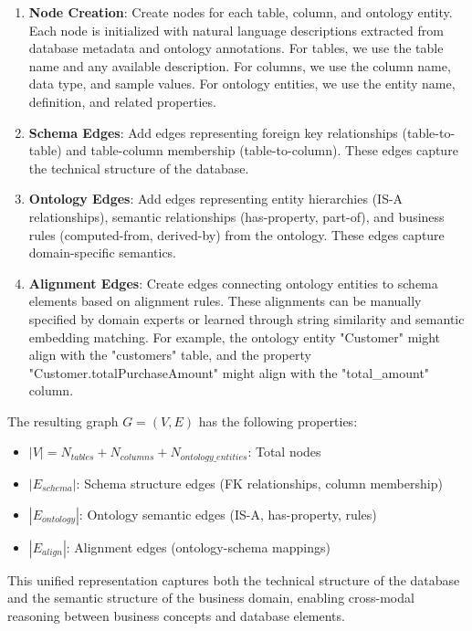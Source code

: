 \documentclass[sigconf, nonatbib]{acmart}
\begin{document}
\begin{enumerate}
    \item \textbf{Node Creation}: Create nodes for each table, column, and ontology entity. Each node is initialized with natural language descriptions extracted from database metadata and ontology annotations. For tables, we use the table name and any available description. For columns, we use the column name, data type, and sample values. For ontology entities, we use the entity name, definition, and related properties.
    
    \item \textbf{Schema Edges}: Add edges representing foreign key relationships (table-to-table) and table-column membership (table-to-column). These edges capture the technical structure of the database.
    
    \item \textbf{Ontology Edges}: Add edges representing entity hierarchies (IS-A relationships), semantic relationships (has-property, part-of), and business rules (computed-from, derived-by) from the ontology. These edges capture domain-specific semantics.
    
    \item \textbf{Alignment Edges}: Create edges connecting ontology entities to schema elements based on alignment rules. These alignments can be manually specified by domain experts or learned through string similarity and semantic embedding matching. For example, the ontology entity "Customer" might align with the "customers" table, and the property "Customer.totalPurchaseAmount" might align with the "total\_amount" column.
\end{enumerate}

The resulting graph $G = (V, E)$ has the following properties:
\begin{itemize}
    \item $|V| = N_{tables} + N_{columns} + N_{ontology\_entities}$: Total nodes
    \item $|E_{schema}|$: Schema structure edges (FK relationships, column membership)
    \item $|E_{ontology}|$: Ontology semantic edges (IS-A, has-property, rules)
    \item $|E_{align}|$: Alignment edges (ontology-schema mappings)
\end{itemize}

This unified representation captures both the technical structure of the database and the semantic structure of the business domain, enabling cross-modal reasoning between business concepts and database elements.
\end{document}

